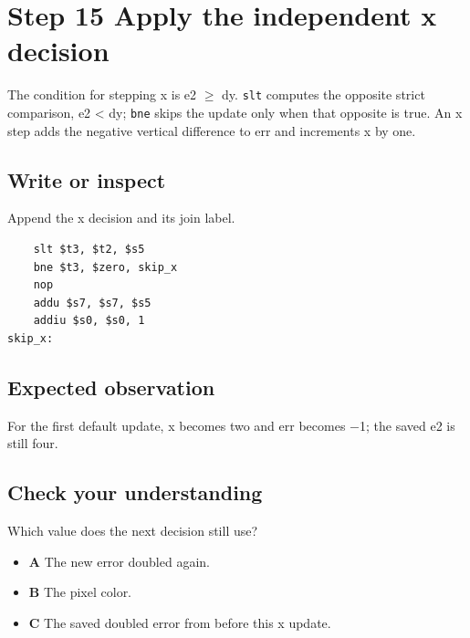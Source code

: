 \section{Step 15 Apply the independent x
  decision}\label{007-bresenham-line-s15-step-15-apply-the-independent-x-decision}

The condition for stepping x is e2 \ensuremath{\geq} dy. \texttt{slt} computes the
opposite strict comparison, e2 \textless{} dy; \texttt{bne} skips the
update only when that opposite is true. An x step adds the negative
vertical difference to err and increments x by one.

\subsection{Write or
  inspect}\label{007-bresenham-line-s15-write-or-inspect}

Append the x decision and its join label.

\begin{verbatim}
    slt $t3, $t2, $s5
    bne $t3, $zero, skip_x
    nop
    addu $s7, $s7, $s5
    addiu $s0, $s0, 1
skip_x:
\end{verbatim}

\subsection{Expected
  observation}\label{007-bresenham-line-s15-expected-observation}

For the first default update, x becomes two and err becomes \ensuremath{-}1; the
saved e2 is still four.

\subsection{Check your
  understanding}\label{007-bresenham-line-s15-check-your-understanding}

Which value does the next decision still use?

\begin{itemize}
  \tightlist
  \item
        \textbf{A} The new error doubled again.
  \item
        \textbf{B} The pixel color.
  \item
        \textbf{C} The saved doubled error from before this x update.
\end{itemize}
